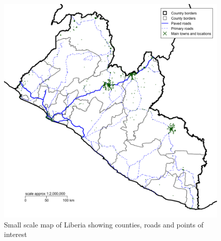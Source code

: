 \documentclass[12pt,a4paper]{book}
\theoremstyle{definition}
\theoremstyle{definition}
\theoremstyle{definition}
\theoremstyle{remark}
\begin{document}
\begin{figure}[H]

{\centering \includegraphics{figures/smallScaleMap-1} 

}

\caption{Small scale map of Liberia showing counties, roads and points of interest}\label{fig:smallScaleMap}
\end{figure}

\newpage
\end{document}
